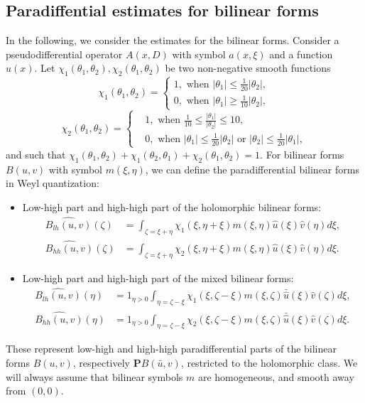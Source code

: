 \documentclass[10pt]{amsart}
\theoremstyle{remark}
\theoremstyle{definition}
\numberwithin{equation}{section}
\newcommand{\nP}{{\mathbf P}}
\begin{document}
\subsection{Paradiffential estimates for bilinear forms}
In the following, we consider the estimates for the bilinear forms.
Consider a pseudodifferential operator $A(x, D)$ with symbol $a(x,\xi)$ and a function $u(x)$.
Let $\chi_1(\theta_1, \theta_2), \chi_2(\theta_1, \theta_2)$ be two non-negative smooth functions 
\begin{equation}
    \chi_1(\theta_1, \theta_2) = \left\{
\begin{aligned}
1, \text{ when } |\theta_1|\leq \frac{1}{20}|\theta_2|,\\
0, \text{ when } |\theta_1|\geq \frac{1}{10}|\theta_2|,
\end{aligned}
\right.  \label{ChiOnelh}
\end{equation}
\begin{equation}
  \chi_2(\theta_1, \theta_2) = \left\{
\begin{aligned}
&1, \text{ when } \frac{1}{10}\leq \frac{|\theta_1|}{|\theta_2|} \leq 10,\\
&0, \text{ when } |\theta_1|\leq \frac{1}{20}|\theta_2| \text{ or } |\theta_2|\leq \frac{1}{20}|\theta_1|,
\end{aligned}
\right.  \label{ChiTwohh}
\end{equation}
and such that $\chi_1(\theta_1, \theta_2) + \chi_1(\theta_2, \theta_1) + \chi_2(\theta_1, \theta_2) =1$.
For bilinear forms $B(u,v)$ with symbol $m(\xi, \eta)$, we can define  the paradifferential bilinear forms in Weyl quantization:
\begin{itemize}
\item Low-high part and high-high part of the holomorphic bilinear forms:
\begin{align*}
 \widehat{B_{lh}(u,v)}(\zeta) &= \int_{\zeta = \xi +\eta} \chi_1\left(\xi, \eta+\xi\right) m(\xi, \eta)\hat{u}(\xi)\hat{v}(\eta) d\xi,\\
  \widehat{B_{hh}(u,v)}(\zeta) &= \int_{\zeta = \xi +\eta} \chi_2\left(\xi, \eta+\xi\right) m(\xi, \eta)\hat{u}(\xi)\hat{v}(\eta) d\xi.
\end{align*}
\item Low-high part and high-high part of the mixed bilinear forms:
\begin{align*}
 \widehat{B_{lh}(u,v)}(\eta) &= 1_{\eta>0}\int_{\eta = \zeta-\xi} \chi_1\left(\xi, \zeta-\xi\right) m(\xi, \zeta)\bar{\hat{u}}(\xi)\hat{v}(\zeta) d\xi,\\
  \widehat{B_{hh}(u,v)}(\eta) &=1_{\eta>0}\int_{\eta = \zeta-\xi} \chi_2\left(\xi, \zeta-\xi\right) m(\xi, \zeta)\bar{\hat{u}}(\xi)\hat{v}(\zeta) d\xi.
\end{align*}
\end{itemize}
These represent low-high and high-high paradifferential parts of the bilinear forms $B(u,v)$, respectively $\nP B(\bar{u},v)$, restricted to the holomorphic class. 
We will always assume that bilinear symbols $m$ are homogeneous, and smooth away from $(0,0)$.
\end{document}
